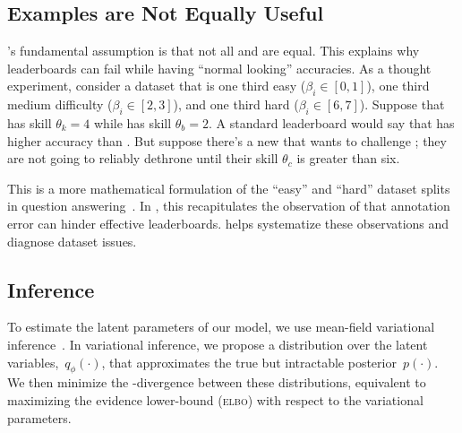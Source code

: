 \subsection{Examples are Not Equally Useful}

\irt{}'s fundamental assumption is that not all \itms{} and
\subjs{} are equal.
This explains why leaderboards can fail while having
``normal looking'' accuracies.
As a thought experiment, consider a dataset that is one third easy
($\beta_i \in [0,1]$), one third medium difficulty
($\beta_i \in [2,3]$), and one third hard ($\beta_i \in [6,7]$).
Suppose that \smart{} has skill $\theta_{k}=4$ while \dumb{} has skill
$\theta_{b}= 2$.
A standard leaderboard would say that \smart{} has higher accuracy
than \dumb{}.
But suppose there's a new \subj{} that wants to challenge \smart{};
they are not going to reliably dethrone \smart{} until their skill
$\theta_{c}$ is greater than six.

This is a more mathematical formulation of the ``easy'' and ``hard''
dataset splits in question
answering~\citep{sugawara2018easier,Rondeau2018-um,sen2020learn}.
In , this recapitulates the observation of
\citet{boydgraber2020nerds} that annotation error can hinder effective
leaderboards.
\name{} helps systematize these observations and diagnose dataset issues.


\subsection{Inference}

To estimate the latent parameters of our model, we use mean-field
variational inference~\cite{jordan-99}.
In variational inference, we propose a distribution over the latent
variables,~$q_\phi(\cdot)$, that approximates the true but intractable
posterior~$p(\cdot)$.
We then minimize the -divergence between these distributions,
equivalent to maximizing the evidence lower-bound (\textsc{elbo}) with
respect to the variational parameters.

